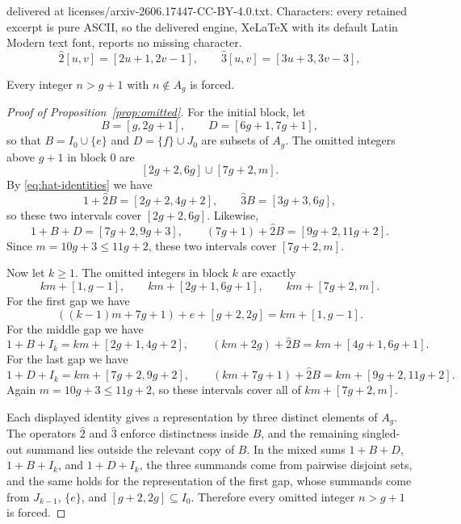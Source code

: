 \documentclass[10pt,a4paper]{amsart}
\newcommand{\hsum}[1]{\widehat{#1}}
\begin{document}
delivered at licenses/arxiv-2606.17447-CC-BY-4.0.txt. Characters: every retained excerpt is pure ASCII, so the delivered engine, XeLaTeX with its default Latin Modern text font, reports no missing character.
\begin{equation}\label{eq:hat-identities}
\hsum{2}[u,v]=[2u+1,2v-1],
\qquad
\hsum{3}[u,v]=[3u+3,3v-3],
\end{equation}

\begin{proposition}\label{prop:omitted}
Every integer $n>g+1$ with $n\notin A_g$ is forced.
\end{proposition}

\begin{proof}[Proof of Proposition~\ref{prop:omitted}]
For the initial block, let
\[
B=[g,2g+1],
\qquad
D=[6g+1,7g+1],
\]
so that $B=I_0\cup\{e\}$ and $D=\{f\}\cup J_0$ are subsets of $A_g$.
The omitted integers above $g+1$ in block $0$ are
\[
[2g+2,6g]\cup[7g+2,m].
\]
By \eqref{eq:hat-identities} we have
\[
1+\hsum{2}B=[2g+2,4g+2],
\qquad
\hsum{3}B=[3g+3,6g],
\]
so these two intervals cover $[2g+2,6g]$. Likewise,
\[
1+B+D=[7g+2,9g+3],
\qquad
(7g+1)+\hsum{2}B=[9g+2,11g+2].
\]
Since $m=10g+3\le 11g+2$, these two intervals cover $[7g+2,m]$.

Now let $k\ge 1$. The omitted integers in block $k$ are exactly
\[
km+[1,g-1],
\qquad
km+[2g+1,6g+1],
\qquad
km+[7g+2,m].
\]
For the first gap we have
\[
((k-1)m+7g+1)+e+[g+2,2g]=km+[1,g-1].
\]
For the middle gap we have
\[
1+B+I_k=km+[2g+1,4g+2],
\qquad
(km+2g)+\hsum{2}B=km+[4g+1,6g+1].
\]
For the last gap we have
\[
1+D+I_k=km+[7g+2,9g+2],
\qquad
(km+7g+1)+\hsum{2}B=km+[9g+2,11g+2].
\]
Again $m=10g+3\le 11g+2$, so these intervals cover all of $km+[7g+2,m]$.

Each displayed identity gives a representation by three distinct elements of $A_g$. The operators $\hsum{2}$ and $\hsum{3}$ enforce distinctness inside $B$, and the remaining singled-out summand lies outside the relevant copy of $B$. In the mixed sums $1+B+D$, $1+B+I_k$, and $1+D+I_k$, the three summands come from pairwise disjoint sets, and the same holds for the representation of the first gap, whose summands come from $J_{k-1}$, $\{e\}$, and $[g+2,2g]\subseteq I_0$. Therefore every omitted integer $n>g+1$ is forced.
\end{proof}
\end{document}
